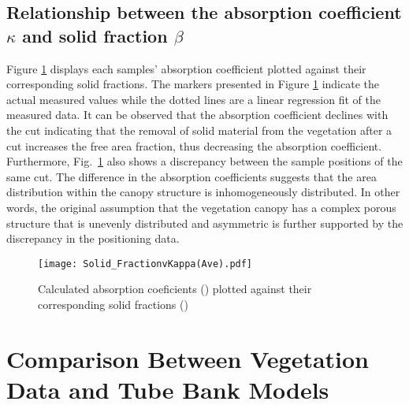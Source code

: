 \documentclass[12pt]{article}
\begin{document}
\subsection{Relationship between the absorption coefficient $\kappa$ and solid fraction $\beta$ }

Figure \ref{fig:betavkappa} displays each samples' absorption coefficient plotted against their corresponding solid fractions. The markers presented in Figure \ref{fig:betavkappa} indicate the actual measured values while the dotted lines are a linear regression fit of the measured data. It can be observed that the absorption coefficient declines with the cut indicating that the removal of solid material from the vegetation after a cut increases the free area fraction, thus decreasing the absorption coefficient. Furthermore, Fig.~\ref{fig:betavkappa} also shows a discrepancy between the sample positions of the same cut. The difference in the absorption coefficients suggests that the area distribution within the canopy structure is inhomogeneously distributed. In other words, the original assumption that the vegetation canopy has a complex porous structure that is unevenly distributed and asymmetric is further supported by the discrepancy in the positioning data.

\begin{figure}[h]
	\centering 	\texttt{[image: Solid\_FractionvKappa(Ave).pdf]}
	\caption{Calculated absorption coeficients (\textkappa) plotted against their corresponding solid fractions (\textbeta) }
	\label{fig:betavkappa}
\end{figure}
\pagebreak

\section{Comparison Between Vegetation Data and Tube Bank Models}
\label{sec:comp}
\end{document}
